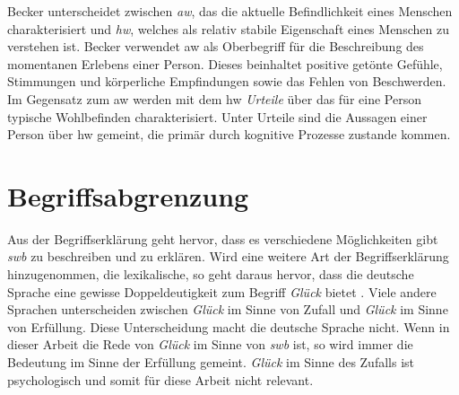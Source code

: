 Becker \cite{Becker:1994} unterscheidet zwischen \textit{\gls{aw}}, das die aktuelle Befindlichkeit eines Menschen charakterisiert und \textit{\gls{hw}}, welches als relativ stabile Eigenschaft eines Menschen zu verstehen ist. Becker verwendet \gls{aw} als Oberbegriff für die Beschreibung des momentanen Erlebens einer Person. Dieses beinhaltet positive getönte Gefühle, Stimmungen und körperliche Empfindungen sowie das Fehlen von Beschwerden. Im Gegensatz zum \gls{aw} werden mit dem \gls{hw} \textit{Urteile} über das für eine Person typische Wohlbefinden charakterisiert. Unter Urteile sind die Aussagen einer Person über \gls{hw} gemeint, die primär durch kognitive Prozesse zustande kommen.

\section{Begriffsabgrenzung}\label{abgrenzung}
Aus der Begriffserklärung geht hervor, dass es verschiedene Möglichkeiten gibt \textit{\gls{swb}} zu beschreiben und zu erklären. Wird eine weitere Art der Begriffserklärung hinzugenommen, die lexikalische, so geht daraus hervor, dass die deutsche Sprache eine gewisse Doppeldeutigkeit zum Begriff \textit{Glück} bietet \cite{Mayring:1991}. Viele andere Sprachen unterscheiden zwischen \textit{Glück} im Sinne von Zufall und \textit{Glück} im Sinne von Erfüllung. Diese Unterscheidung macht die deutsche Sprache nicht. Wenn in dieser Arbeit die Rede von \textit{Glück} im Sinne von \textit{\gls{swb}} ist, so wird immer die Bedeutung im Sinne der Erfüllung gemeint. \textit{Glück} im Sinne des Zufalls ist psychologisch und somit für diese Arbeit nicht relevant.

